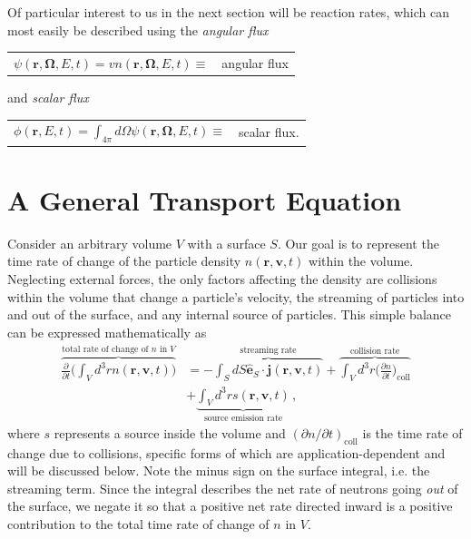 
Of particular interest to us in the next section will be reaction rates, which can most easily be described using the \textit{angular flux}
\begin{center}
  \begin{tabular}{cp{2.0cm}}
    $ \psi (\mathbf{r},\mathbf{\Omega},E,t) = v n(\mathbf{r},\mathbf{\Omega},E,t) \equiv $ &
    angular flux
  \end{tabular}
\end{center}
and \textit{scalar flux}
\begin{center}
  \begin{tabular}{cp{2.0cm}}
    $ \phi (\mathbf{r},E,t) = \int_{4\pi} d\Omega \psi (\mathbf{r},\mathbf{\Omega},E,t)  \equiv $ &
    scalar flux.
  \end{tabular}
\end{center}

\section*{A General Transport Equation}

Consider an arbitrary volume $V$ with a surface $S$.  Our goal is to represent the time rate of change of the particle density $n(\mathbf{r},\mathbf{v},t)$ within the volume.  Neglecting external forces, the only factors affecting the density are collisions within the volume that change a particle's velocity, the streaming of particles into and out of the surface, and any internal source of particles.  This simple balance can be expressed mathematically as
\begin{equation}
\begin{split}
 \overbrace{ \frac{\partial}{\partial t} \Bigg ( \int_V d^3 r n(\mathbf{r},\mathbf{v},t) \Bigg ) }^{\text{total rate of change of }n\text{ in } V} 
      &=  - \overbrace{\int_S dS \mathbf{\hat{e}}_S \cdot \mathbf{j}(\mathbf{r},\mathbf{v},t) }^{\text{streaming rate}}
       + \overbrace{ \int_V d^3 r \Big( \frac{\partial n}{\partial t} \Big )_{\mathrm{coll}} }^{\text{collision rate}} \\
      &+ \underbrace{ \int_V d^3 r s(\mathbf{r},\mathbf{v},t) }_{\text{source emission rate}}  \, ,
\end{split}
\label{eq:balance}
\end{equation}
where $s$ represents a source inside the volume and $(\partial n/\partial t)_{\mathrm{coll}}$ is the time rate of change due to collisions, specific forms of which are application-dependent and will be discussed below.  Note the minus sign on the surface integral, i.e. the streaming term.  Since the integral describes the net rate of neutrons going \textit{out} of the surface, we negate it so that a positive net rate directed inward is a positive contribution to the total time rate of change of $n$ in $V$.

